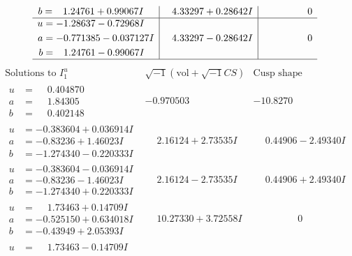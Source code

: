 \documentclass[1p]{elsarticle_modified}
\theoremstyle{definition}
\newcommand{\I}{\sqrt{-1}}
\begin{document}
$$\begin{array}{c|c|c}
\begin{aligned}
b &= \phantom{-}1.24761 + 0.99067 I\end{aligned}
 & \phantom{-}4.33297 + 0.28642 I & \phantom{-0.000000 } 0 \\ \hline\begin{aligned}
u &= -1.28637 - 0.72968 I \\
a &= -0.771385 - 0.037127 I \\
b &= \phantom{-}1.24761 - 0.99067 I\end{aligned}
 & \phantom{-}4.33297 - 0.28642 I & \phantom{-0.000000 } 0\\
 \hline 
 \end{array}$$\newpage$$\begin{array}{c|c|c}  
\text{Solutions to }I^u_{1}& \I (\text{vol} + \sqrt{-1}CS) & \text{Cusp shape}\\
 \hline 
\begin{aligned}
u &= \phantom{-}0.404870\phantom{ +0.000000I} \\
a &= \phantom{-}1.84305\phantom{ +0.000000I} \\
b &= \phantom{-}0.402148\phantom{ +0.000000I}\end{aligned}
 & -0.970503\phantom{ +0.000000I} & -10.8270\phantom{ +0.000000I} \\ \hline\begin{aligned}
u &= -0.383604 + 0.036914 I \\
a &= -0.83236 + 1.46023 I \\
b &= -1.274340 - 0.220333 I\end{aligned}
 & \phantom{-}2.16124 + 2.73535 I & \phantom{-}0.44906 - 2.49340 I \\ \hline\begin{aligned}
u &= -0.383604 - 0.036914 I \\
a &= -0.83236 - 1.46023 I \\
b &= -1.274340 + 0.220333 I\end{aligned}
 & \phantom{-}2.16124 - 2.73535 I & \phantom{-}0.44906 + 2.49340 I \\ \hline\begin{aligned}
u &= \phantom{-}1.73463 + 0.14709 I \\
a &= -0.525150 + 0.634018 I \\
b &= -0.43949 + 2.05393 I\end{aligned}
 & \phantom{-}10.27330 + 3.72558 I & \phantom{-0.000000 } 0 \\ \hline\begin{aligned}
u &= \phantom{-}1.73463 - 0.14709 I \\

\end{aligned}
\end{array}$$
\end{document}
